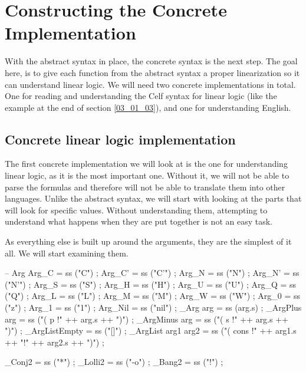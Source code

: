 \section{Constructing the Concrete Implementation}
\label{04_02}

With the abstract syntax in place, the concrete syntax is the next step. The goal here, is to give each function from the abstract syntax a proper linearization so it can understand linear logic. We will need two concrete implementations in total. One for reading and understanding the Celf syntax for linear logic (like the example at the end of section \ref{03_01_03}), and one for understanding English.

\subsection{Concrete linear logic implementation}
\label{04_02_01}

The first concrete implementation we will look at is the one for understanding linear logic, as it is the most important one. Without it, we will not be able to parse the formulas and therefore will not be able to translate them into other languages. Unlike the abstract syntax, we will start with looking at the parts that will look for specific values. Without understanding them, attempting to understand what happens when they are put together is not an easy task.

As everything else is built up around the arguments, they are the simplest of it all. We will start examining them.
\begin{lstgf}
        -- Arg
        Arg_C                           = ss ("C") ;
        Arg_C'                          = ss ("C'") ;
        Arg_N                           = ss ("N") ;
        Arg_N'                          = ss ("N'") ;
        Arg_S                           = ss ("S") ;
        Arg_H                           = ss ("H") ;
        Arg_U                           = ss ("U") ;
        Arg_Q                           = ss ("Q") ;
        Arg_L                           = ss ("L") ;
        Arg_M                           = ss ("M") ;
        Arg_W                           = ss ("W") ;
        Arg_0                           = ss ("z") ;
        Arg_1                           = ss ("1") ;
        Arg_Nil                         = ss ("nil") ;
        _Arg arg                        = ss (arg.s) ;
        _ArgPlus arg                    = ss ("( p !" ++ arg.s ++ ")") ;
        _ArgMinus arg                   = ss ("( s !" ++ arg.s ++ ")") ;
        _ArgListEmpty                   = ss ("[]") ;
        _ArgList arg1 arg2              = ss ("( cons !" ++ arg1.s ++ "!" ++ arg2.s ++ ")") ;
        
        _Conj2                          = ss ("*") ;
        _Lolli2                         = ss ("-o") ;
        _Bang2                          = ss ("!") ;
\end{lstgf}

